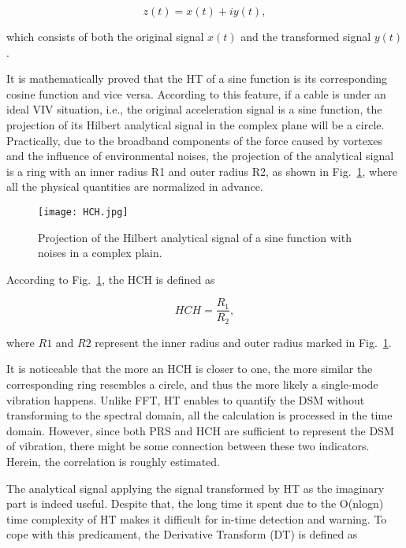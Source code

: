 \documentclass[preprint, 3p, times, compress, 11pt]{elsarticle}
\begin{document}
\begin{equation}
    z(t) = x(t) + iy(t),
    \label{eq:comp_sign}
\end{equation}

which consists of both the original 
signal $x(t)$ and the transformed signal $y(t)$. 

It is mathematically proved that the HT of a sine function is its 
corresponding cosine function and vice versa. According to this feature, 
if a cable is under an ideal VIV situation, i.e., the original acceleration 
signal is a sine function, the projection of its Hilbert analytical 
signal in the complex plane will be a circle. Practically, 
due to the broadband components of the force caused by vortexes and the 
influence of environmental noises, the projection of the analytical 
signal is a ring with an inner radius R1 and outer radius R2, as shown 
in Fig.~\ref{fig:HCH}, where all the physical quantities are 
normalized in advance.

\begin{figure}[ht]
    \centering
    \texttt{[image: HCH.jpg]}
    \caption{Projection of the Hilbert analytical signal of a sine 
            function with noises in a complex plain.}
    \label{fig:HCH}
\end{figure}

According to Fig.~\ref{fig:HCH}, the HCH is defined as 

\begin{equation}
    HCH = \frac{R_1}{R_2},
    \label{eq:HCH}
\end{equation}

where $R1$ and $R2$ represent the inner radius and outer radius 
marked in Fig.~\ref{fig:HCH}.

It is noticeable that the more an HCH is closer to one, the more 
similar the corresponding ring resembles a circle, and thus the more 
likely a single-mode vibration happens. 
Unlike FFT, HT enables to quantify the DSM without transforming to the 
spectral domain, all the calculation is processed in the time domain. 
However, since both PRS and HCH are sufficient 
to represent the DSM of vibration, there might be some connection between
these two indicators. Herein, the correlation is roughly estimated. 


The analytical signal applying the signal transformed by HT as the 
imaginary part is indeed useful. Despite that, the long time it spent 
due to the O(nlogn) time complexity of HT makes it difficult for in-time 
detection and warning. To cope with this predicament, the Derivative 
Transform (DT) is defined as 
\end{document}

